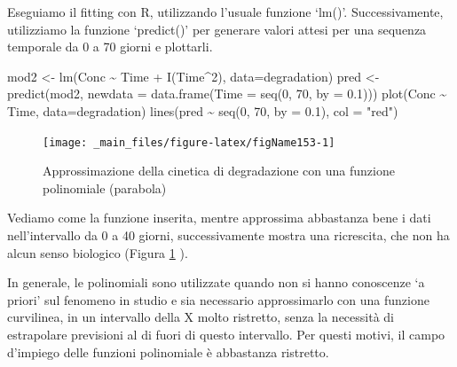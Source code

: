 \documentclass[a4paper,12pt,oneside]{book}
\newenvironment{Shaded}{\begin{snugshade}}{\end{snugshade}}
\newcommand{\DecValTok}[1]{#1}
\newcommand{\FloatTok}[1]{#1}
\newcommand{\SpecialCharTok}[1]{#1}
\newcommand{\StringTok}[1]{#1}
\newcommand{\OtherTok}[1]{#1}
\newcommand{\FunctionTok}[1]{#1}
\newcommand{\AttributeTok}[1]{#1}
\newcommand{\NormalTok}[1]{#1}
\begin{document}
Eseguiamo il fitting con R, utilizzando l'usuale funzione `lm()'. Successivamente, utilizziamo la funzione `predict()' per generare valori attesi per una sequenza temporale da 0 a 70 giorni e plottarli.

\begin{Shaded}
\begin{Highlighting}[]
\NormalTok{mod2 }\OtherTok{\textless{}{-}} \FunctionTok{lm}\NormalTok{(Conc }\SpecialCharTok{\textasciitilde{}}\NormalTok{ Time }\SpecialCharTok{+} \FunctionTok{I}\NormalTok{(Time}\SpecialCharTok{\^{}}\DecValTok{2}\NormalTok{), }\AttributeTok{data=}\NormalTok{degradation)}
\NormalTok{pred }\OtherTok{\textless{}{-}} \FunctionTok{predict}\NormalTok{(mod2, }\AttributeTok{newdata =} \FunctionTok{data.frame}\NormalTok{(}\AttributeTok{Time =} \FunctionTok{seq}\NormalTok{(}\DecValTok{0}\NormalTok{, }\DecValTok{70}\NormalTok{, }\AttributeTok{by =} \FloatTok{0.1}\NormalTok{)))}
\FunctionTok{plot}\NormalTok{(Conc }\SpecialCharTok{\textasciitilde{}}\NormalTok{ Time, }\AttributeTok{data=}\NormalTok{degradation)}
\FunctionTok{lines}\NormalTok{(pred }\SpecialCharTok{\textasciitilde{}} \FunctionTok{seq}\NormalTok{(}\DecValTok{0}\NormalTok{, }\DecValTok{70}\NormalTok{, }\AttributeTok{by =} \FloatTok{0.1}\NormalTok{), }\AttributeTok{col =} \StringTok{"red"}\NormalTok{)}
\end{Highlighting}
\end{Shaded}

\begin{figure}

{\centering \texttt{[image: \_main\_files/figure-latex/figName153-1]} 

}

\caption{Approssimazione della cinetica di degradazione con una funzione polinomiale (parabola)}\label{fig:figName153}
\end{figure}

Vediamo come la funzione inserita, mentre approssima abbastanza bene i dati nell'intervallo da 0 a 40 giorni, successivamente mostra una ricrescita, che non ha alcun senso biologico (Figura \ref{fig:figName153} ).

In generale, le polinomiali sono utilizzate quando non si hanno conoscenze `a priori' sul fenomeno in studio e sia necessario approssimarlo con una funzione curvilinea, in un intervallo della X molto ristretto, senza la necessità di estrapolare previsioni al di fuori di questo intervallo. Per questi motivi, il campo d'impiego delle funzioni polinomiale è abbastanza ristretto.
\end{document}
